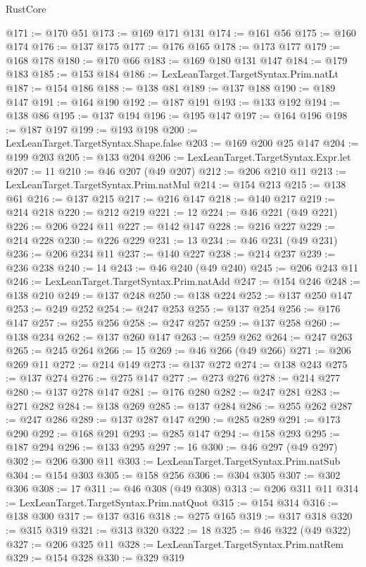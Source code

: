 \begin{lexlean}{RustCore}
\begin{coremodule}
@171 := @170 @51
@173 := @169 @171 @131
@174 := @161 @56
@175 := @160 @174
@176 := @137 @175
@177 := @176 @165
@178 := @173 @177
@179 := @168 @178
@180 := @170 @66
@183 := @169 @180 @131 @147
@184 := @179 @183
@185 := @153 @184
@186 := LexLeanTarget.TargetSyntax.Prim.natLt
@187 := @154 @186
@188 := @138 @81
@189 := @137 @188
@190 := @189 @147
@191 := @164 @190
@192 := @187 @191
@193 := @133 @192
@194 := @138 @86
@195 := @137 @194
@196 := @195 @147
@197 := @164 @196
@198 := @187 @197
@199 := @193 @198
@200 := LexLeanTarget.TargetSyntax.Shape.false
@203 := @169 @200 @25 @147
@204 := @199 @203
@205 := @133 @204
@206 := LexLeanTarget.TargetSyntax.Expr.let
@207 := 11
@210 := @46 @207 (@49 @207)
@212 := @206 @210 @11
@213 := LexLeanTarget.TargetSyntax.Prim.natMul
@214 := @154 @213
@215 := @138 @61
@216 := @137 @215
@217 := @216 @147
@218 := @140 @217
@219 := @214 @218
@220 := @212 @219
@221 := 12
@224 := @46 @221 (@49 @221)
@226 := @206 @224 @11
@227 := @142 @147
@228 := @216 @227
@229 := @214 @228
@230 := @226 @229
@231 := 13
@234 := @46 @231 (@49 @231)
@236 := @206 @234 @11
@237 := @140 @227
@238 := @214 @237
@239 := @236 @238
@240 := 14
@243 := @46 @240 (@49 @240)
@245 := @206 @243 @11
@246 := LexLeanTarget.TargetSyntax.Prim.natAdd
@247 := @154 @246
@248 := @138 @210
@249 := @137 @248
@250 := @138 @224
@252 := @137 @250 @147
@253 := @249 @252
@254 := @247 @253
@255 := @137 @254
@256 := @176 @147
@257 := @255 @256
@258 := @247 @257
@259 := @137 @258
@260 := @138 @234
@262 := @137 @260 @147
@263 := @259 @262
@264 := @247 @263
@265 := @245 @264
@266 := 15
@269 := @46 @266 (@49 @266)
@271 := @206 @269 @11
@272 := @214 @149
@273 := @137 @272
@274 := @138 @243
@275 := @137 @274
@276 := @275 @147
@277 := @273 @276
@278 := @214 @277
@280 := @137 @278 @147
@281 := @176 @280
@282 := @247 @281
@283 := @271 @282
@284 := @138 @269
@285 := @137 @284
@286 := @255 @262
@287 := @247 @286
@289 := @137 @287 @147
@290 := @285 @289
@291 := @173 @290
@292 := @168 @291
@293 := @285 @147
@294 := @158 @293
@295 := @187 @294
@296 := @133 @295
@297 := 16
@300 := @46 @297 (@49 @297)
@302 := @206 @300 @11
@303 := LexLeanTarget.TargetSyntax.Prim.natSub
@304 := @154 @303
@305 := @158 @256
@306 := @304 @305
@307 := @302 @306
@308 := 17
@311 := @46 @308 (@49 @308)
@313 := @206 @311 @11
@314 := LexLeanTarget.TargetSyntax.Prim.natQuot
@315 := @154 @314
@316 := @138 @300
@317 := @137 @316
@318 := @275 @165
@319 := @317 @318
@320 := @315 @319
@321 := @313 @320
@322 := 18
@325 := @46 @322 (@49 @322)
@327 := @206 @325 @11
@328 := LexLeanTarget.TargetSyntax.Prim.natRem
@329 := @154 @328
@330 := @329 @319

\end{coremodule}
\end{lexlean}
